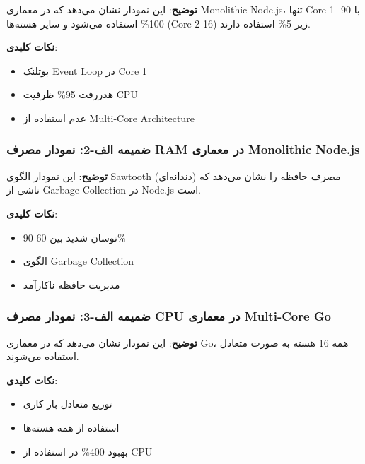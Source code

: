 \documentclass[
]{article}
\providecommand{\tightlist}{%
  \setlength{\itemsep}{0pt}\setlength{\parskip}{0pt}}
\begin{document}
\textbf{توضیح}: این نمودار نشان می‌دهد که در معماری Monolithic Node.js،
تنها Core 1 با 90-100\% استفاده می‌شود و سایر هسته‌ها (Core 2-16) زیر 5\%
استفاده دارند.

\textbf{نکات کلیدی}:

\begin{itemize}
\tightlist
\item
  بوتلنک Event Loop در Core 1
\item
  هدررفت 95\% ظرفیت CPU
\item
  عدم استفاده از Multi-Core Architecture
\end{itemize}

\subsubsection{ضمیمه الف-2: نمودار مصرف RAM در معماری Monolithic
Node.js}\label{ux636ux645ux6ccux645ux647-ux627ux644ux641-2-ux646ux645ux648ux62fux627ux631-ux645ux635ux631ux641-ram-ux62fux631-ux645ux639ux645ux627ux631ux6cc-monolithic-node.js}

\textbf{توضیح}: این نمودار الگوی Sawtooth (دندانه‌ای) مصرف حافظه را نشان
می‌دهد که ناشی از Garbage Collection در Node.js است.

\textbf{نکات کلیدی}:

\begin{itemize}
\tightlist
\item
  نوسان شدید بین 60-90\%
\item
  الگوی Garbage Collection
\item
  مدیریت حافظه ناکارآمد
\end{itemize}

\subsubsection{ضمیمه الف-3: نمودار مصرف CPU در معماری Multi-Core
Go}\label{ux636ux645ux6ccux645ux647-ux627ux644ux641-3-ux646ux645ux648ux62fux627ux631-ux645ux635ux631ux641-cpu-ux62fux631-ux645ux639ux645ux627ux631ux6cc-multi-core-go}

\textbf{توضیح}: این نمودار نشان می‌دهد که در معماری Go، همه 16 هسته به
صورت متعادل استفاده می‌شوند.

\textbf{نکات کلیدی}:

\begin{itemize}
\tightlist
\item
  توزیع متعادل بار کاری
\item
  استفاده از همه هسته‌ها
\item
  بهبود 400\% در استفاده از CPU
\end{itemize}
\end{document}
